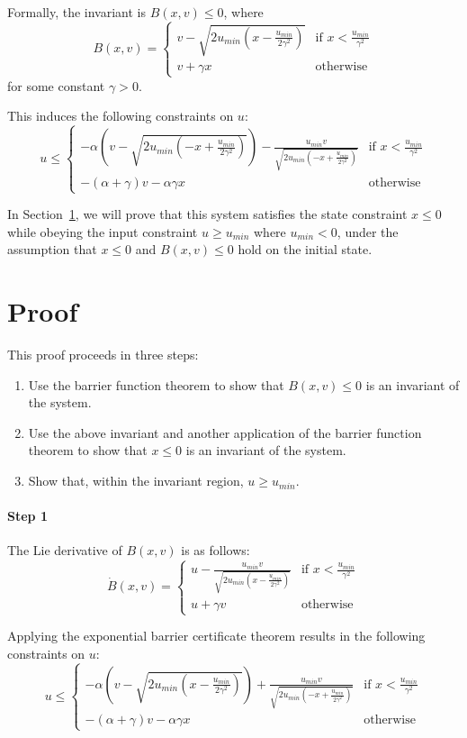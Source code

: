 \documentclass[12pt]{article}
\newcommand{\umin}{u_{min}}
\newcommand{\p}{\gamma}
\newcommand{\q}{\alpha}
\begin{document}
Formally, the invariant is $B(x,v) \leq 0$, where
\[B(x,v) =
\begin{cases}
v - \sqrt{2\umin(x - \frac{\umin}{2\p^2})} & \text{if } x < \frac{\umin}{\p^2}\\
v + \p x & \text{otherwise}
\end{cases}
\]
for some constant $\p > 0$.

This induces the following constraints on $u$:
\[
u \leq
\begin{cases}
-\q(v - \sqrt{2\umin(-x + \frac{\umin}{2\p^2})}) - \frac{\umin v}{\sqrt{2\umin(-x + \frac{\umin}{2\p^2})}} & \text{if } x < \frac{\umin}{\p^2}\\
-(\q + \p) v -\q\p x & \text{otherwise}
\end{cases}
\]

In Section~\ref{sec:proof}, we will prove that this system satisfies the
state constraint $x \leq 0$ while obeying the input constraint $u \geq
\umin$ where $\umin < 0$, under the assumption that $x \leq 0$ and $B(x,v)
\leq 0$ hold on the initial state.

\section{Proof}
\label{sec:proof}
This proof proceeds in three steps:
\begin{enumerate}
\item Use the barrier function theorem to show that $B(x,v) \leq 0$ is an invariant of the system.
\item Use the above invariant and another application of the barrier function theorem to show that $x \leq 0$ is an invariant of the system.
\item Show that, within the invariant region, $u \geq \umin$.
\end{enumerate}

\paragraph*{Step 1}
The Lie derivative of $B(x,v)$ is as follows:
\[\dot{B}(x,v) =
\begin{cases}
u - \frac{\umin v}{\sqrt{2\umin(x - \frac{\umin}{2\p^2})}} & \text{if } x < \frac{\umin}{\p^2}\\
u + \p v & \text{otherwise}
\end{cases}
\]

Applying the exponential barrier certificate theorem results in the following constraints on $u$:
\[
u \leq
\begin{cases}
-\q\left(v - \sqrt{2\umin(x - \frac{\umin}{2\p^2})}\right) + \frac{\umin v}{\sqrt{2\umin(-x + \frac{\umin}{2\p^2})}} & \text{if } x < \frac{\umin}{\p^2}\\
-(\q + \p) v -\q\p x & \text{otherwise}
\end{cases}
\]
\end{document}
